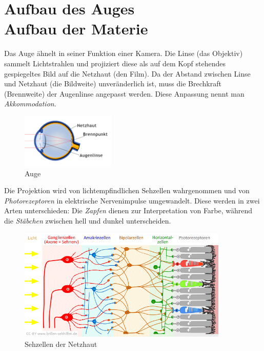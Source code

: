 \section[Aufbau des Auges\hfill Aufbau der Materie]{Aufbau des Auges\\{\normalsize Aufbau der Materie}}
\label{sec:auge}

Das Auge ähnelt in seiner Funktion einer Kamera. Die Linse (das Objektiv) sammelt Lichtstrahlen und projiziert diese als auf dem Kopf stehendes gespiegeltes Bild auf die Netzhaut (den Film). Da der Abstand zwischen Linse und Netzhaut (die Bildweite) unveränderlich ist, muss die Brechkraft (Brennweite) der Augenlinse angepasst werden. Diese Anpassung nennt man \textit{Akkommodation}.

\begin{figure}
	\centering
	\includegraphics[width=4.5cm]{images/auge.png}
	\caption{Auge \cite{abadi:fehlsichtigkeit}}
\end{figure}

Die Projektion wird von lichtempfindlichen Sehzellen wahrgenommen und von \textit{Photorezeptoren} in elektrische Nervenimpulse umgewandelt. Diese werden in zwei Arten unterschieden: Die \textit{Zapfen} dienen zur Interpretation von Farbe, während die \textit{Stäbchen} zwischen hell und dunkel unterscheiden.

\begin{figure}
	\centering
	\includegraphics[width=10cm]{images/netzhaut.png}
	\caption{Sehzellen der Netzhaut \cite{bs:auge}}
\end{figure}

